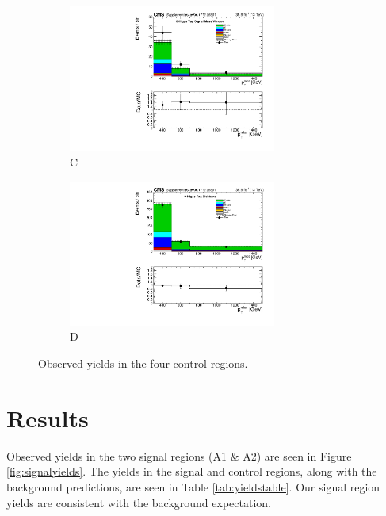 \begin{figure}[htbp]
\begin{subfigure}[b]{0.5\textwidth}
\begin{centering}
\includegraphics[width=0.75\textwidth]{figs/Unblinding_antitagSR.pdf}
\caption{C}
\end{centering}
\end{subfigure}
\begin{subfigure}[b]{0.5\textwidth}
\begin{centering}
\includegraphics[width=0.75\textwidth]{figs/Unblinding_antitagSB.pdf}
\caption{D}
\end{centering}
\end{subfigure}

\caption{Observed yields in the four control regions.}
\label{fig:controlyields}
\end{figure}

\section{Results}

Observed yields in the two signal regions (A1 \& A2) are seen in Figure \ref{fig:signalyields}. The yields in the signal and control regions, along with the background predictions, are seen in Table \ref{tab:yieldstable}. Our signal region yields are consistent with the background expectation.

